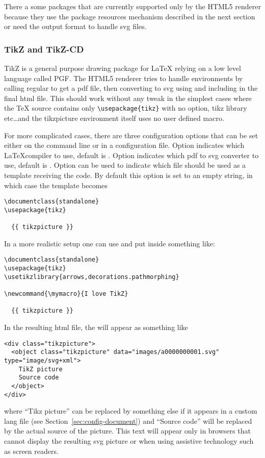 There a some packages that are currently supported only by the HTML5
renderer because they use the package resources mechanism described in
the next section or need the output format to handle svg files.

\subsubsection{TikZ and TikZ-CD}\label{sec:tikz}

TikZ is a general purpose drawing package for LaTeX relying on a low
level language called PGF. The HTML5 renderer tries to handle
 environments by calling regular
 to get a pdf file, then converting to svg using
 and including in the final html file. This should work
without any tweak in the simplest cases where the TeX source contains
only \verb+\usepackage{tikz}+ with no option, tikz library etc\ldots and the
tikzpicture environment itself uses no user defined macro.

For more complicated cases, there are three configuration options that
can be set either on the command line or in a configuration file. Option
 indicates which \LaTeX compiler to use,
default is . Option
 indicates which pdf to svg converter
to use, default is . Option
 can be used to indicate which file
should be used as a template receiving the 
code. By default this option is set to an empty string, in which case
the template becomes
\begin{verbatim}
\documentclass{standalone}
\usepackage{tikz}

  {{ tikzpicture }}

\end{verbatim}
In a more realistic setup one can use 
 and put inside  something
like:
\begin{verbatim}
\documentclass{standalone}
\usepackage{tikz}
\usetikzlibrary{arrows,decorations.pathmorphing}

\newcommand{\mymacro}{I love TikZ}

  {{ tikzpicture }}

\end{verbatim}

In the resulting html file, the  will appear as
something like
\begin{verbatim}
<div class="tikzpicture">
  <object class="tikzpicture" data="images/a0000000001.svg" type="image/svg+xml">
    TikZ picture
    Source code
  </object>
</div>
\end{verbatim}
where ``Tikz picture'' can be replaced by something else if it appears
in a custom lang file (see Section~\ref{sec:config-document}) and
``Source code'' will be replaced by the actual source of the
picture. This text will appear only in browsers that cannot display the
resulting svg picture or when using assistive technology such as screen
readers.


